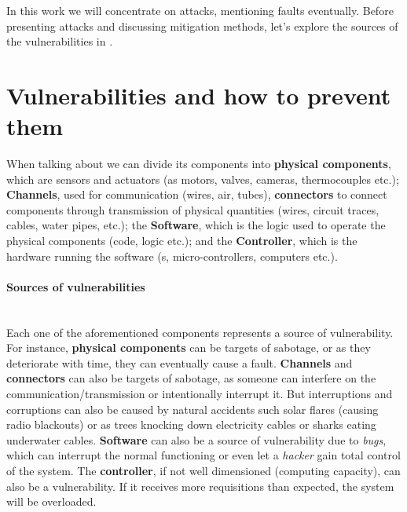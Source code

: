 \documentclass[../main.tex]{subfiles}
\begin{document}
In this work we will concentrate on attacks, mentioning faults eventually.
Before presenting attacks and discussing mitigation methods, let's explore the sources of the vulnerabilities in \cps{}.

\section{Vulnerabilities and how to prevent them}

When talking about \cps{} we can divide its components into \textbf{physical components}, which are sensors and actuators (as motors, valves, cameras, thermocouples etc.);
\textbf{Channels}, used for communication (wires, air, tubes), \textbf{connectors} to connect components through transmission of physical quantities (wires, circuit traces, cables, water pipes, etc.);
the \textbf{Software}, which is the logic used to operate the physical components (code, \plc{} logic etc.); and the \textbf{Controller}, which is the hardware running the software (\plc{}s, micro-controllers, computers etc.).

\paragraph{Sources of vulnerabilities}
~\\Each one of the aforementioned components represents a source of vulnerability.
\\For instance, \textbf{physical components} can be targets of sabotage, or as they deteriorate with time, they can eventually cause a fault.
\textbf{Channels} and \textbf{connectors} can also be targets of sabotage, as someone can interfere on the communication/transmission or intentionally interrupt it. But interruptions and corruptions can also be caused by natural accidents such solar flares (causing radio blackouts) or as trees knocking down electricity cables or sharks eating underwater cables.
\textbf{Software} can also be a source of vulnerability due to \emph{bugs}, which can interrupt the normal functioning or even let a \emph{hacker} gain total control of the system.
The \textbf{controller}, if not well dimensioned (computing capacity), can also be a vulnerability.
If it receives more requisitions than expected, the system will be overloaded.
\end{document}
